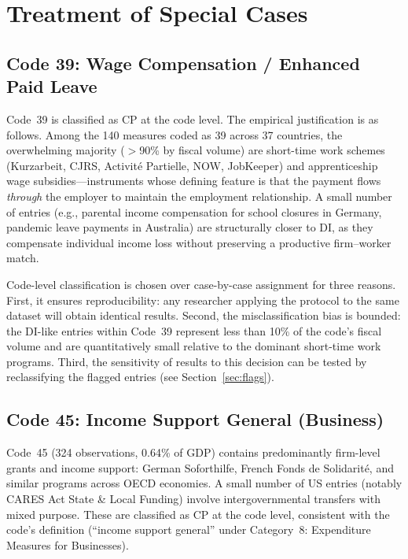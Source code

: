 \documentclass[12pt,a4paper]{article}
\begin{document}
\section{Treatment of Special Cases}

\subsection{Code 39: Wage Compensation / Enhanced Paid Leave}
\label{sec:code39}

Code~39 is classified as CP at the code level. The empirical justification is as
follows. Among the 140 measures coded as 39 across 37 countries, the overwhelming
majority ($>$90\% by fiscal volume) are short-time work schemes (Kurzarbeit, CJRS,
Activit\'{e} Partielle, NOW, JobKeeper) and apprenticeship wage subsidies---instruments
whose defining feature is that the payment flows \emph{through} the employer to
maintain the employment relationship. A small number of entries (e.g., parental
income compensation for school closures in Germany, pandemic leave payments in
Australia) are structurally closer to DI, as they compensate individual income loss
without preserving a productive firm--worker match.

Code-level classification is chosen over case-by-case assignment for three reasons.
First, it ensures reproducibility: any researcher applying the protocol to the same
dataset will obtain identical results. Second, the misclassification bias is bounded:
the DI-like entries within Code~39 represent less than 10\% of the code's fiscal
volume and are quantitatively small relative to the dominant short-time work programs.
Third, the sensitivity of results to this decision can be tested by reclassifying
the flagged entries (see Section~\ref{sec:flags}).

\subsection{Code 45: Income Support General (Business)}

Code~45 (324 observations, 0.64\% of GDP) contains predominantly firm-level grants
and income support: German Soforthilfe, French Fonds de Solidarit\'{e}, and similar
programs across OECD economies. A small number of US entries (notably CARES Act
State \& Local Funding) involve intergovernmental transfers with mixed purpose. These
are classified as CP at the code level, consistent with the code's definition
(``income support general'' under Category~8: Expenditure Measures for Businesses).
\end{document}
